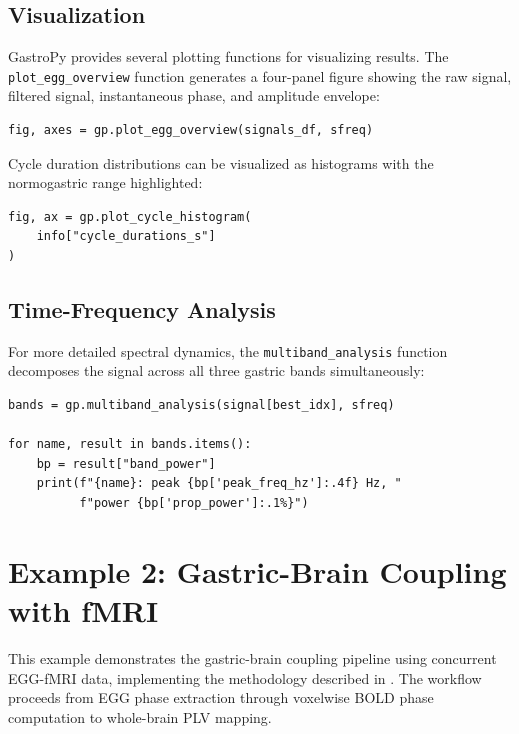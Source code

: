 \documentclass[12pt]{article}
\begin{document}
\subsection{Visualization}

GastroPy provides several plotting functions for visualizing results. The
\texttt{plot\_egg\_overview} function generates a four-panel figure showing the
raw signal, filtered signal, instantaneous phase, and amplitude envelope:

\begin{lstlisting}
fig, axes = gp.plot_egg_overview(signals_df, sfreq)
\end{lstlisting}

Cycle duration distributions can be visualized as histograms with the
normogastric range highlighted:

\begin{lstlisting}
fig, ax = gp.plot_cycle_histogram(
    info["cycle_durations_s"]
)
\end{lstlisting}

\subsection{Time-Frequency Analysis}

For more detailed spectral dynamics, the \texttt{multiband\_analysis} function
decomposes the signal across all three gastric bands simultaneously:

\begin{lstlisting}
bands = gp.multiband_analysis(signal[best_idx], sfreq)

for name, result in bands.items():
    bp = result["band_power"]
    print(f"{name}: peak {bp['peak_freq_hz']:.4f} Hz, "
          f"power {bp['prop_power']:.1%}")
\end{lstlisting}

\section{Example 2: Gastric-Brain Coupling with fMRI}

This example demonstrates the gastric-brain coupling pipeline using concurrent
EGG-fMRI data, implementing the methodology described in
\citet{Banellis2025}. The workflow proceeds from EGG phase extraction through
voxelwise BOLD phase computation to whole-brain PLV mapping.
\end{document}
